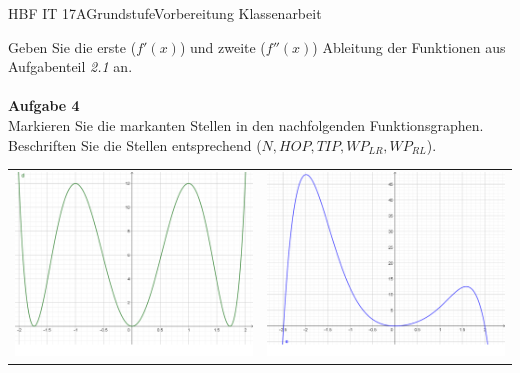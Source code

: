 \documentclass[oneside,openany,headings=optiontotoc,11pt,numbers=noenddot]{scrreprt}
\begin{document}
\begin{worksheet}{HBF IT 17A}{Grundstufe}{Vorbereitung Klassenarbeit}
\begin{framed}
			Geben Sie die erste (\(f'(x)\)) und zweite (\(f''(x)\)) Ableitung der Funktionen aus Aufgabenteil \textit{2.1} an.\\
			\hdashrule[0.5ex][x]{\textwidth}{0.1mm}{8mm 2pt}\\
			\textbf{Aufgabe 4}\\
			Markieren Sie die markanten Stellen in den nachfolgenden Funktionsgraphen.\\
			Beschriften Sie die Stellen entsprechend (\(N, HOP, TIP, WP_{LR}, WP_{RL}\)).\\
			\par
			\begin{tabularx}{\textwidth}{X|X}
				\includegraphics[scale=0.25]{Bilder/KAUebungBilder/d0.png} & \includegraphics[scale=0.25]{Bilder/KAUebungBilder/e0.png} \\

\end{tabularx}
\end{framed}
\end{worksheet}
\end{document}
